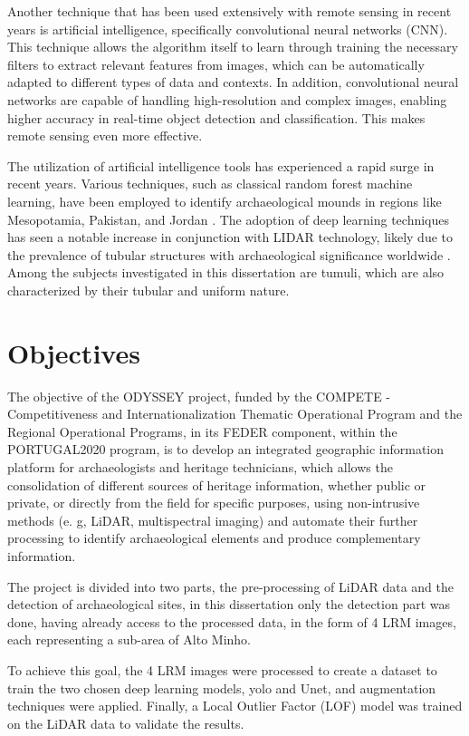 Another technique that has been used extensively with remote sensing in recent years is artificial intelligence, specifically convolutional neural networks (CNN). This technique allows the algorithm itself to learn through training the necessary filters to extract relevant features from images, which can be automatically adapted to different types of data and contexts. In addition, convolutional neural networks are capable of handling high-resolution and complex images, enabling higher accuracy in real-time object detection and classification. This makes remote sensing even more effective.


The utilization of artificial intelligence tools has experienced a rapid surge in recent years\cite{aumentoexpDL}. Various techniques, such as classical random forest machine learning, have been employed to identify archaeological mounds in regions like Mesopotamia, Pakistan, and Jordan \cite{LIDARCOMDL}. The adoption of deep learning techniques has seen a notable increase in conjunction with LIDAR technology, likely due to the prevalence of tubular structures with archaeological significance worldwide \cite{LIDARCOMDL}. Among the subjects investigated in this dissertation are tumuli, which are also characterized by their tubular and uniform nature.


\section{Objectives}
The objective of the ODYSSEY project, funded by the COMPETE - Competitiveness and Internationalization Thematic Operational Program and the Regional Operational Programs, in its FEDER component, within the PORTUGAL2020 program, is to develop an integrated geographic information platform for archaeologists and heritage technicians, which allows the consolidation of different sources of heritage information, whether public or private, or directly from the field for specific purposes, using non-intrusive methods (e. g, LiDAR, multispectral imaging) and automate their further processing to identify archaeological elements and produce complementary information.

The project is divided into two parts, the pre-processing of LiDAR data and the detection of archaeological sites, in this dissertation only the detection part was done, having already access to the processed data, in the form of 4 LRM images, each representing a sub-area of Alto Minho.

To achieve this goal, the 4 LRM images were processed to create a dataset to train the two chosen deep learning models, \ac{yolo} and Unet, and augmentation techniques were applied. Finally, a Local Outlier Factor (LOF) model was trained on the LiDAR data to validate the results.

